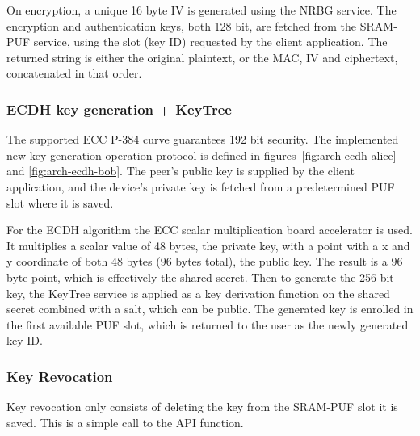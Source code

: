 On encryption, a unique 16 byte \ac{IV} is generated using the \ac{NRBG} service.
The encryption and authentication keys, both 128 bit, are fetched from the SRAM-PUF service, using the slot (key ID) requested by the client application.
The returned string is either the original plaintext, or the \ac{MAC}, \ac{IV} and ciphertext, concatenated in that order.




\subsubsection*{ECDH key generation + KeyTree}
The supported \ac{ECC} P-384 curve guarantees 192 bit security.
The implemented new key generation operation protocol is defined in figures~\ref{fig:arch-ecdh-alice} and \ref{fig:arch-ecdh-bob}.
The peer's public key is supplied by the client application, and the device's private key is fetched from a predetermined PUF slot where it is saved.

For the ECDH algorithm the ECC scalar multiplication board accelerator is used. It multiplies a scalar value of 48 bytes, the private key, with a point with a x and y coordinate of both 48 bytes (96 bytes total), the public key.
The result is a 96 byte point, which is effectively the shared secret.
Then to generate the 256 bit key, the KeyTree service is applied as a key derivation function on the shared secret combined with a salt, which can be public.
The generated key is enrolled in the first available PUF slot, which is returned to the user as the newly generated key ID.

\subsubsection*{Key Revocation}
Key revocation only consists of deleting the key from the SRAM-PUF slot it is saved. This is a simple call to the API function.


